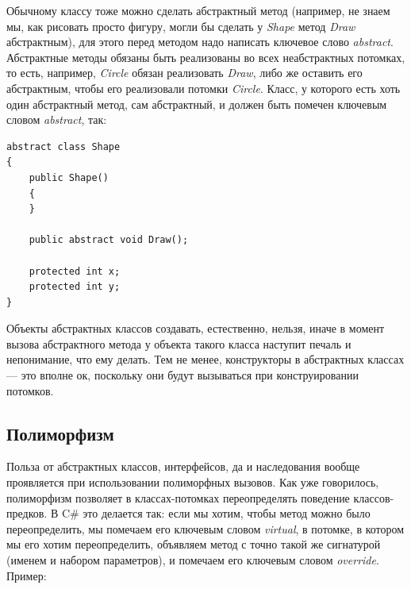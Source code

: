 \documentclass[a5paper]{article}
\begin{document}
Обычному классу тоже можно сделать абстрактный метод (например, не знаем мы, как рисовать просто фигуру, могли бы сделать у \textit{Shape} метод \textit{Draw} абстрактным), для этого перед методом надо написать ключевое слово \textit{abstract}. Абстрактные методы обязаны быть реализованы во всех неабстрактных потомках, то есть, например, \textit{Circle} обязан реализовать \textit{Draw}, либо же оставить его абстрактным, чтобы его реализовали потомки \textit{Circle}. Класс, у которого есть хоть один абстрактный метод, сам абстрактный, и должен быть помечен ключевым словом \textit{abstract}, так:

\begin{verbatim}
abstract class Shape
{
    public Shape() 
    { 
    }

    public abstract void Draw();

    protected int x;
    protected int y;
}
\end{verbatim}

Объекты абстрактных классов создавать, естественно, нельзя, иначе в момент вызова абстрактного метода у объекта такого класса наступит печаль и непонимание, что ему делать. Тем не менее, конструкторы в абстрактных классах --- это вполне ок, поскольку они будут вызываться при конструировании потомков.

\subsection{Полиморфизм}

Польза от абстрактных классов, интерфейсов, да и наследования вообще проявляется при использовании полиморфных вызовов. Как уже говорилось, полиморфизм позволяет в классах-потомках переопределять поведение классов-предков. В C\# это делается так: если мы хотим, чтобы метод можно было переопределить, мы помечаем его ключевым словом \textit{virtual}, в потомке, в котором мы его хотим переопределить, объявляем метод с точно такой же сигнатурой (именем и набором параметров), и помечаем его ключевым словом \textit{override}. Пример:
\end{document}
